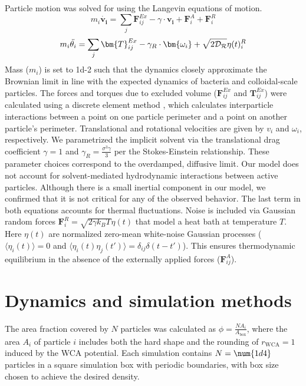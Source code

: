 Particle motion was solved for using the Langevin equations of motion.
\begin{equation}
m_i\dot{\bm{v_i}} = \sum_{j}\bm{F}^{Ex}_{ij} - \gamma\cdot\bm{v_i} + \bm{F}^A_i + \bm{F}^R_i
\end{equation}
\begin{equation}
m_i\Ddot{\theta_i} = \sum_{j}\bm{T}^{Ex}_{ij} - \gamma_R\cdot\bm{\omega_i} + \sqrt{2\mathcal{D_R}}\eta(t)_i^R
\end{equation}
Mass ($m_i$) is set to \num{1d-2} such that the dynamics closely approximate the Brownian limit in line with the expected dynamics of bacteria and colloidal-scale particles.
The forces and torques due to excluded volume ($\bm{F}^{Ex}_{ij}$ and $\bm{T}^{Ex}_{ij}$) were calculated using a discrete element method \cite{DEM_2017}, which calculates interparticle interactions between a point on one particle perimeter and a point on another particle's perimeter.
Translational and rotational velocities are given by $v_i$ and $\omega_i$, respectively.
We parametrized the implicit solvent via the translational drag coefficient $\gamma=1$ and $\gamma_R = \frac{\sigma^3\gamma}{3}$ per the Stokes-Einstein relationship.
These parameter choices correspond to the overdamped, diffusive limit.
Our model does not account for solvent-mediated hydrodynamic interactions between active particles.
Although there is a small inertial component in our model, we confirmed that it is not critical for any of the observed behavior.
The last term in both equations accounts for thermal fluctuations.
Noise is included via Gaussian random forces $\bm{F}^R_i = \sqrt{2\gamma k_BT}\eta(t)$ that model a heat bath at temperature $T$.
Here $\eta(t)$ are normalized zero-mean white-noise Gaussian processes ($ \langle \eta_i(t) \rangle = 0 $ and $ \langle \eta_i(t)\eta_j(t') \rangle = \delta_{ij}\delta(t-t') $).
This ensures thermodynamic equilibrium in the absence of the externally applied forces ($\bm{F}^{A}_{ij}$).


\section{Dynamics and simulation methods}

The area fraction covered by $N$ particles was calculated as $\phi=\frac{NA_i}{A_\text{box}}$, where the area $A_i$ of particle $i$ includes both the hard shape and the rounding of $r_\text{WCA}=1$ induced by the WCA potential.
Each simulation contains $N=\num{1d4}$ particles in a square simulation box with periodic boundaries, with box size chosen to achieve the desired density.


